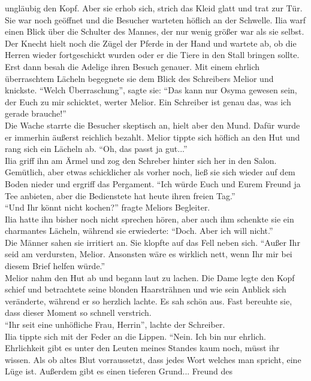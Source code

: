 ungläubig den Kopf. Aber sie erhob sich, strich das Kleid glatt und trat zur Tür. Sie war noch 
geöffnet und die Besucher warteten höflich an der Schwelle. Ilia warf einen Blick über die Schulter 
des Mannes, der nur wenig größer war als sie selbst. Der Knecht hielt noch die Zügel der Pferde in 
der Hand und wartete ab, ob die Herren wieder fortgeschickt wurden oder er die Tiere in den Stall 
bringen sollte. Erst dann besah die Adelige ihren Besuch genauer. Mit einem ehrlich überraschtem 
Lächeln begegnete sie dem Blick des Schreibers Melior und knickste. ``Welch Überraschung'', sagte 
sie: ``Das kann nur Osyma gewesen sein, der Euch zu mir schicktet, werter Melior. Ein Schreiber ist 
genau das, was ich gerade brauche!''\\
Die Wache starrte die Besucher skeptisch an, hielt aber den Mund. Dafür wurde er immerhin äußerst 
reichlich bezahlt. Melior tippte sich höflich an den Hut und rang sich ein Lächeln ab. ``Oh, das 
passt ja gut...''\\
Ilia griff ihn am Ärmel und zog den Schreber hinter sich her in den Salon. Gemütlich, aber etwas 
schicklicher als vorher noch, ließ sie sich wieder auf dem Boden nieder und ergriff das Pergament. 
``Ich würde Euch und Eurem Freund ja Tee anbieten, aber die Bedienstete hat heute ihren freien 
Tag.''\\
``Und Ihr könnt nicht kochen?'' fragte Meliors Begleiter.\\
Ilia hatte ihn bisher noch nicht sprechen hören, aber auch ihm schenkte sie ein charmantes Lächeln, 
während sie erwiederte: ``Doch. Aber ich will nicht.''\\
Die Männer sahen sie irritiert an. Sie klopfte auf das Fell neben sich. ``Außer Ihr seid am 
verdursten, Melior. Ansonsten wäre es wirklich nett, wenn Ihr mir bei diesem Brief helfen würde.''\\
Melior nahm den Hut ab und begann laut zu lachen. Die Dame legte den Kopf schief und betrachtete 
seine blonden Haarsträhnen und wie sein Anblick sich veränderte, während er so herzlich lachte. Es 
sah schön aus. Fast bereuhte sie, dass dieser Moment so schnell verstrich.\\
``Ihr seit eine unhöfliche Frau, Herrin'', lachte der Schreiber.\\
Ilia tippte sich mit der Feder an die Lippen. ``Nein. Ich bin nur ehrlich. Ehrlichkeit gibt es 
unter den Leuten meines Standes kaum noch, müsst ihr wissen. Als ob altes Blut vorraussetzt, dass 
jedes Wort welches man spricht, eine Lüge ist. Außerdem gibt es einen tieferen Grund... Freund des 
